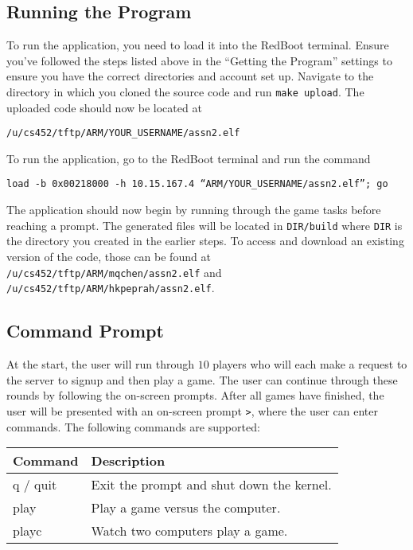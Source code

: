 \documentclass[12pt]{article}
\begin{document}
\subsection{Running the Program}
To run the application, you need to load it into the RedBoot terminal.  Ensure you've followed the steps listed above in the ``Getting the Program'' settings to ensure you have the correct directories and account set up.  Navigate to the directory in which you cloned the source code and run \texttt{make upload}.  The uploaded code should now be located at
\begin{center}
  \texttt{/u/cs452/tftp/ARM/YOUR\_USERNAME/assn2.elf}
\end{center}
To run the application, go to the RedBoot terminal and run the command
\begin{center}
  \texttt{load -b 0x00218000 -h 10.15.167.4 ``ARM/YOUR\_USERNAME/assn2.elf''; go}
\end{center}
The application should now begin by running through the game tasks before reaching a prompt.  The generated files will be located in \texttt{DIR/build} where \texttt{DIR} is the directory you created in the earlier steps.  To access and download an existing version of the code, those can be found at \texttt{/u/cs452/tftp/ARM/mqchen/assn2.elf} and \texttt{/u/cs452/tftp/ARM/hkpeprah/assn2.elf}.
\\[1\baselineskip]

\subsection{Command Prompt}
At the start, the user will run through $10$ players who will each make a request to the server to signup and then play a game.  The user can continue through these rounds by following the on-screen prompts.  After all games have finished, the user will be presented with an on-screen prompt \texttt{\textgreater}, where the user can enter commands.  The following commands are supported:
\begin{center}
  \begin{tabular}{|l|l|}
    \hline
    {\bf Command } & {\bf Description} \\\hline
    q / quit & Exit the prompt and shut down the kernel. \\\hline
    play & Play a game versus the computer. \\\hline
    playc & Watch two computers play a game. \\\hline
  \end{tabular}
  \\[2\baselineskip]
\end{center}
\end{document}
